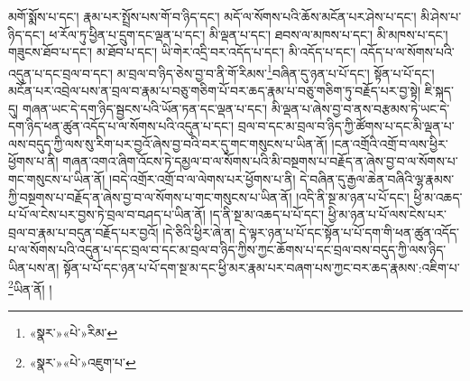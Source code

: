 མགོ་སྨོས་པ་དང་། རྣམ་པར་སྤྲོས་པས་གོ་བ་ཉིད་དང་། མདོ་ལ་སོགས་པའི་ཆོས་མངོན་པར་ཤེས་པ་དང་། མི་ཤེས་པ་ཉིད་དང་། ཕ་རོལ་ཏུ་ཕྱིན་པ་དྲུག་དང་ལྡན་པ་དང་། མི་ལྡན་པ་དང་། ཐབས་ལ་མཁས་པ་དང་། མི་མཁས་པ་དང་། གཟུངས་ཐོབ་པ་དང་། མ་ཐོབ་པ་དང་། ཡི་གེར་འདྲི་བར་འདོད་པ་དང་། མི་འདོད་པ་དང་། འདོད་པ་ལ་སོགས་པའི་འདུན་པ་དང་བྲལ་བ་དང་། མ་བྲལ་བ་ཉིད་ཅེས་བྱ་བ་ནི་གོ་རིམས་\footnote{«སྣར་»«པེ་»རིམ་}བཞིན་དུ་ཉན་པ་པོ་དང་། སྟོན་པ་པོ་དང་། མངོན་པར་འབྲེལ་པས་ན་བྲལ་བ་རྣམ་པ་བཅུ་གཅིག་པོ་བར་ཆད་རྣམ་པ་བཅུ་གཅིག་ཏུ་བརྗོད་པར་བྱ་སྟེ། ཇི་སྐད་དུ། གཞན་ཡང་དེ་དག་ཉིད་སྦྱངས་པའི་ཡོན་ཏན་དང་ལྡན་པ་དང་། མི་ལྡན་པ་ཞེས་བྱ་བ་ནས་བརྩམས་ཏེ་ཡང་དེ་དག་ཉིད་ཕན་ཚུན་འདོད་པ་ལ་སོགས་པའི་འདུན་པ་དང་། བྲལ་བ་དང་མ་བྲལ་བ་ཉིད་ཀྱི་ཚོགས་པ་དང་མི་ལྡན་པ་ལས་བདུད་ཀྱི་ལས་སུ་རིག་པར་བྱའོ་ཞེས་བྱ་བའི་བར་དུ་གང་གསུངས་པ་ཡིན་ནོ། །ངན་འགྲོའི་འགྲོ་བ་ལས་ཕྱིར་ཕྱོགས་པ་ནི། གཞན་འགའ་ཞིག་འོངས་ཏེ་དམྱལ་བ་ལ་སོགས་པའི་མི་བསྔགས་པ་བརྗོད་ན་ཞེས་བྱ་བ་ལ་སོགས་པ་གང་གསུངས་པ་ཡིན་ནོ། །བདེ་འགྲོར་འགྲོ་བ་ལ་ལེགས་པར་ཕྱོགས་པ་ནི། དེ་བཞིན་དུ་རྒྱལ་ཆེན་བཞིའི་ལྷ་རྣམས་ཀྱི་བསྔགས་པ་བརྗོད་ན་ཞེས་བྱ་བ་ལ་སོགས་པ་གང་གསུངས་པ་ཡིན་ནོ། །འདི་ནི་སྔ་མ་ཉན་པ་པོ་དང་། ཕྱི་མ་འཆད་པ་པོ་ལ་ངེས་པར་བྱས་ཏེ་བྲལ་བ་བཤད་པ་ཡིན་ནོ། །ད་ནི་སྔ་མ་འཆད་པ་པོ་དང་། ཕྱི་མ་ཉན་པ་པོ་ལས་ངེས་པར་བྲལ་བ་རྣམ་པ་བདུན་བརྗོད་པར་བྱའོ། །དེ་ཅིའི་ཕྱིར་ཞེ་ན། དེ་ལྟར་ཉན་པ་པོ་དང་སྟོན་པ་པོ་དག་གི་ཕན་ཚུན་འདོད་པ་ལ་སོགས་པའི་འདུན་པ་དང་བྲལ་བ་དང་མ་བྲལ་བ་ཉིད་ཀྱིས་ཀྱང་ཆོགས་པ་དང་བྲལ་བས་བདུད་ཀྱི་ལས་ཉིད་ཡིན་པས་ན། སྟོན་པ་པོ་དང་ཉན་པ་པོ་དག་སྔ་མ་དང་ཕྱི་མར་རྣམ་པར་བཞག་པས་ཀྱང་བར་ཆད་རྣམས་:འཇིག་པ་\footnote{«སྣར་»«པེ་»འཇུག་པ་}ཡིན་ནོ། །
